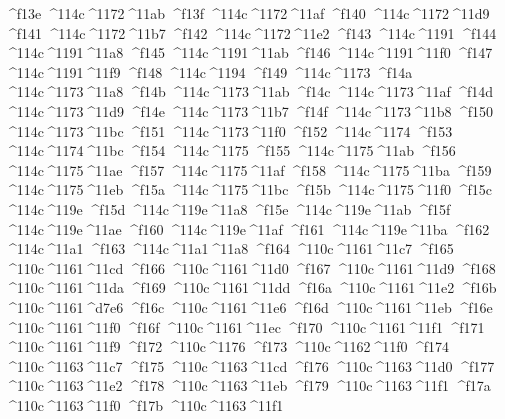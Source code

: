 \checkit ^^^^f13e ^^^^114c^^^^1172^^^^11ab
\checkit ^^^^f13f ^^^^114c^^^^1172^^^^11af
\checkit ^^^^f140 ^^^^114c^^^^1172^^^^11d9
\checkit ^^^^f141 ^^^^114c^^^^1172^^^^11b7
\checkit ^^^^f142 ^^^^114c^^^^1172^^^^11e2
\checkit ^^^^f143 ^^^^114c^^^^1191
\checkit ^^^^f144 ^^^^114c^^^^1191^^^^11a8
\checkit ^^^^f145 ^^^^114c^^^^1191^^^^11ab
\checkit ^^^^f146 ^^^^114c^^^^1191^^^^11f0
\checkit ^^^^f147 ^^^^114c^^^^1191^^^^11f9
\checkit ^^^^f148 ^^^^114c^^^^1194
\checkit ^^^^f149 ^^^^114c^^^^1173
\checkit ^^^^f14a ^^^^114c^^^^1173^^^^11a8
\checkit ^^^^f14b ^^^^114c^^^^1173^^^^11ab
\checkit ^^^^f14c ^^^^114c^^^^1173^^^^11af
\checkit ^^^^f14d ^^^^114c^^^^1173^^^^11d9
\checkit ^^^^f14e ^^^^114c^^^^1173^^^^11b7
\checkit ^^^^f14f ^^^^114c^^^^1173^^^^11b8
\checkit ^^^^f150 ^^^^114c^^^^1173^^^^11bc
\checkit ^^^^f151 ^^^^114c^^^^1173^^^^11f0
\checkit ^^^^f152 ^^^^114c^^^^1174
\checkit ^^^^f153 ^^^^114c^^^^1174^^^^11bc
\checkit ^^^^f154 ^^^^114c^^^^1175
\checkit ^^^^f155 ^^^^114c^^^^1175^^^^11ab
\checkit ^^^^f156 ^^^^114c^^^^1175^^^^11ae
\checkit ^^^^f157 ^^^^114c^^^^1175^^^^11af
\checkit ^^^^f158 ^^^^114c^^^^1175^^^^11ba
\checkit ^^^^f159 ^^^^114c^^^^1175^^^^11eb
\checkit ^^^^f15a ^^^^114c^^^^1175^^^^11bc
\checkit ^^^^f15b ^^^^114c^^^^1175^^^^11f0
\checkit ^^^^f15c ^^^^114c^^^^119e
\checkit ^^^^f15d ^^^^114c^^^^119e^^^^11a8
\checkit ^^^^f15e ^^^^114c^^^^119e^^^^11ab
\checkit ^^^^f15f ^^^^114c^^^^119e^^^^11ae
\checkit ^^^^f160 ^^^^114c^^^^119e^^^^11af
\checkit ^^^^f161 ^^^^114c^^^^119e^^^^11ba
\checkit ^^^^f162 ^^^^114c^^^^11a1
\checkit ^^^^f163 ^^^^114c^^^^11a1^^^^11a8
\checkit ^^^^f164 ^^^^110c^^^^1161^^^^11c7
\checkit ^^^^f165 ^^^^110c^^^^1161^^^^11cd
\checkit ^^^^f166 ^^^^110c^^^^1161^^^^11d0
\checkit ^^^^f167 ^^^^110c^^^^1161^^^^11d9
\checkit ^^^^f168 ^^^^110c^^^^1161^^^^11da
\checkit ^^^^f169 ^^^^110c^^^^1161^^^^11dd
\checkit ^^^^f16a ^^^^110c^^^^1161^^^^11e2
\checkit ^^^^f16b ^^^^110c^^^^1161^^^^d7e6
\checkit ^^^^f16c ^^^^110c^^^^1161^^^^11e6
\checkit ^^^^f16d ^^^^110c^^^^1161^^^^11eb
\checkit ^^^^f16e ^^^^110c^^^^1161^^^^11f0
\checkit ^^^^f16f ^^^^110c^^^^1161^^^^11ec
\checkit ^^^^f170 ^^^^110c^^^^1161^^^^11f1
\checkit ^^^^f171 ^^^^110c^^^^1161^^^^11f9
\checkit ^^^^f172 ^^^^110c^^^^1176
\checkit ^^^^f173 ^^^^110c^^^^1162^^^^11f0
\checkit ^^^^f174 ^^^^110c^^^^1163^^^^11c7
\checkit ^^^^f175 ^^^^110c^^^^1163^^^^11cd
\checkit ^^^^f176 ^^^^110c^^^^1163^^^^11d0
\checkit ^^^^f177 ^^^^110c^^^^1163^^^^11e2
\checkit ^^^^f178 ^^^^110c^^^^1163^^^^11eb
\checkit ^^^^f179 ^^^^110c^^^^1163^^^^11f1
\checkit ^^^^f17a ^^^^110c^^^^1163^^^^11f0
\checkit ^^^^f17b ^^^^110c^^^^1163^^^^11f1
